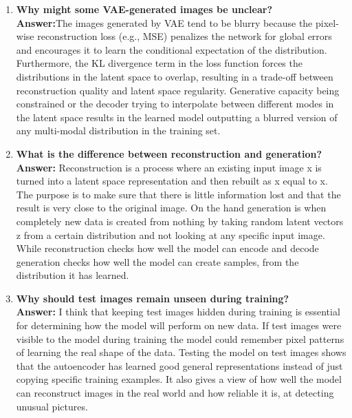 \documentclass[10pt]{article}
\begin{document}
\begin{enumerate}
\vspace{5mm}

\item \textbf{Why might some VAE-generated images be unclear?}\\[1.5mm]
\textbf{Answer:}The images generated by VAE tend to be blurry because the pixel-wise reconstruction loss (e.g., MSE) penalizes the network for global errors and encourages it to learn the conditional expectation of the distribution. Furthermore, the KL divergence term in the loss function forces the distributions in the latent space to overlap, resulting in a trade-off between reconstruction quality and latent space regularity. Generative capacity being constrained or the decoder trying to interpolate between different modes in the latent space results in the learned model outputting a blurred version of any multi-modal distribution in the training set.

\vspace{5mm}

\item \textbf{What is the difference between reconstruction and generation?}\\[1.5mm]
\textbf{Answer:} Reconstruction is a process where an existing input image x is turned into a latent space representation and then rebuilt as x equal to x. The purpose is to make sure that there is little information lost and that the result is very close to the original image. On the hand generation is when completely new data is created from nothing by taking random latent vectors z from a certain distribution and not looking at any specific input image. While reconstruction checks how well the model can encode and decode generation checks how well the model can create samples, from the distribution it has learned.

\vspace{5mm}

\item \textbf{Why should test images remain unseen during training?}\\[1.5mm]
\textbf{Answer:} I think that keeping test images hidden during training is essential for determining how the model will perform on new data. If test images were visible to the model during training the model could remember pixel patterns of learning the real shape of the data. Testing the model on test images shows that the autoencoder has learned good general representations instead of just copying specific training examples. It also gives a view of how well the model can reconstruct images in the real world and how reliable it is, at detecting unusual pictures.

\end{enumerate}
\end{document}
